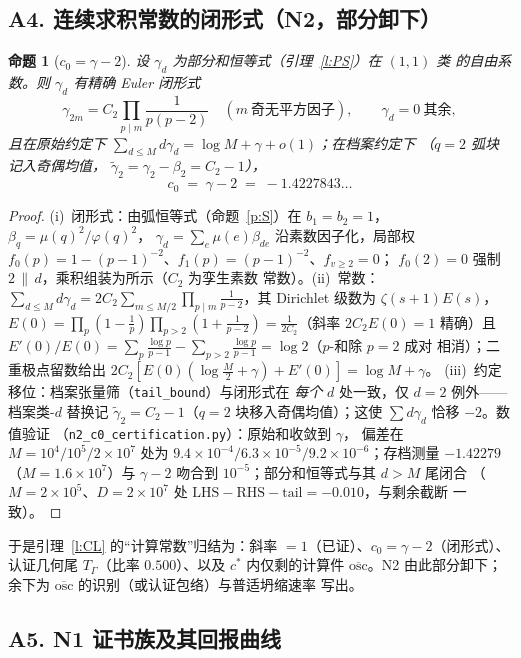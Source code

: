 \documentclass[11pt]{article}
\numberwithin{equation}{section}
\newtheorem{proposition}[theorem]{命题}
\theoremstyle{definition}
\theoremstyle{remark}
\begin{document}
\subsection*{A4. 连续求积常数的闭形式（N2，部分卸下）}

\begin{proposition}[$c_0=\gamma-2$]\label{p:c0}
设 $\gamma_d$ 为部分和恒等式（引理~\ref{l:PS}）在 $(1,1)$ 类
的自由系数。则 $\gamma_d$ 有精确 Euler 闭形式
\[
\gamma_{2m}=C_2\prod_{p\mid m}\frac1{p(p-2)}
\quad(m\ \text{奇无平方因子}),\qquad
\gamma_d=0\ \text{其余},
\]
且在原始约定下
$\sum_{d\le M}d\gamma_d=\log M+\gamma+o(1)$；在档案约定下
（$q=2$ 弧块记入奇偶均值，
$\widetilde\gamma_2=\gamma_2-\beta_2=C_2-1$），
\[
c_0\;=\;\gamma-2\;=\;-1.4227843\ldots
\]
\end{proposition}

\begin{proof}
(i)~闭形式：由弧恒等式（命题~\ref{p:S}）在 $b_1=b_2=1$，
$\beta_q=\mu(q)^2/\varphi(q)^2$，
$\gamma_d=\sum_e\mu(e)\beta_{de}$ 沿素数因子化，局部权
$f_0(p)=1-(p-1)^{-2}$、$f_1(p)=(p-1)^{-2}$、$f_{v\ge2}=0$；
$f_0(2)=0$ 强制 $2\,\|\,d$，乘积组装为所示（$C_2$ 为孪生素数
常数）。(ii)~常数：$\sum_{d\le M}d\gamma_d
=2C_2\sum_{m\le M/2}\prod_{p\mid m}\tfrac1{p-2}$，其
Dirichlet 级数为 $\zeta(s+1)E(s)$，
$E(0)=\prod_p(1-\tfrac1p)\prod_{p>2}(1+\tfrac1{p-2})
=\tfrac1{2C_2}$（斜率 $2C_2E(0)=1$ 精确）且
$E'(0)/E(0)=\sum_p\tfrac{\log p}{p-1}
-\sum_{p>2}\tfrac{\log p}{p-1}=\log2$（$p$-和除 $p=2$ 成对
相消）；二重极点留数给出
$2C_2[E(0)(\log\tfrac M2+\gamma)+E'(0)]=\log M+\gamma$。
(iii)~约定移位：档案张量筛（\texttt{tail\_bound}）与闭形式在
\emph{每个} $d$ 处一致，仅 $d=2$ 例外——档案类-$d$ 替换记
$\widetilde\gamma_2=C_2-1$（$q=2$ 块移入奇偶均值）；这使
$\sum d\gamma_d$ 恰移 $-2$。数值验证
（\texttt{n2\_c0\_certification.py}）：原始和收敛到 $\gamma$，
偏差在 $M=10^4/10^5/2\times10^7$ 处为
$9.4\times10^{-4}/6.3\times10^{-5}/9.2\times10^{-6}$；存档测量
$-1.42279$（$M=1.6\times10^{7}$）与 $\gamma-2$ 吻合到
$10^{-5}$；部分和恒等式与其 $d>M$ 尾闭合
（$M=2\times10^5$、$D=2\times10^{7}$ 处
$\mathrm{LHS}-\mathrm{RHS}-\mathrm{tail}=-0.010$，与剩余截断
一致）。
\end{proof}

\noindent 于是引理~\ref{l:CL} 的``计算常数''归结为：斜率
$=1$（已证）、$c_0=\gamma-2$（闭形式）、认证几何尾
$T_\Gamma$（比率 $0.500$）、以及 $c^{*}$ 内仅剩的计算件
$\overline{\mathrm{osc}}$。N2 由此部分卸下；余下为
$\overline{\mathrm{osc}}$ 的识别（或认证包络）与普适坍缩速率
写出。

\subsection*{A5. N1 证书族及其回报曲线}
\end{document}
